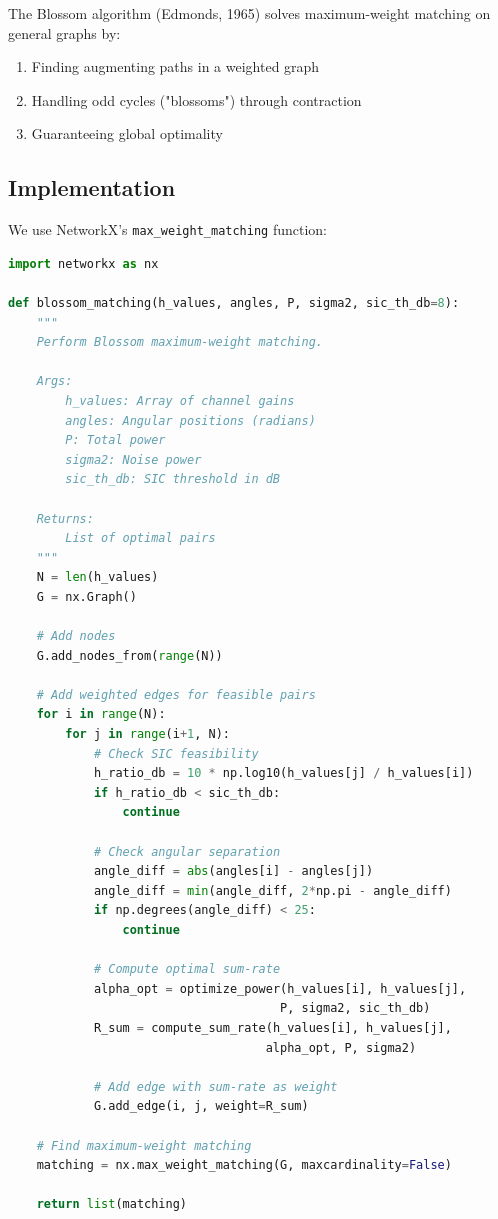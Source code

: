 The Blossom algorithm (Edmonds, 1965) solves maximum-weight matching on general graphs by:

\begin{enumerate}
    \item Finding augmenting paths in a weighted graph
    \item Handling odd cycles ("blossoms") through contraction
    \item Guaranteeing global optimality
\end{enumerate}

\subsection{Implementation}

We use NetworkX's \texttt{max\_weight\_matching} function:

\begin{lstlisting}[language=Python, caption={Blossom Matching Implementation}]
import networkx as nx

def blossom_matching(h_values, angles, P, sigma2, sic_th_db=8):
    """
    Perform Blossom maximum-weight matching.
    
    Args:
        h_values: Array of channel gains
        angles: Angular positions (radians)
        P: Total power
        sigma2: Noise power
        sic_th_db: SIC threshold in dB
    
    Returns:
        List of optimal pairs
    """
    N = len(h_values)
    G = nx.Graph()
    
    # Add nodes
    G.add_nodes_from(range(N))
    
    # Add weighted edges for feasible pairs
    for i in range(N):
        for j in range(i+1, N):
            # Check SIC feasibility
            h_ratio_db = 10 * np.log10(h_values[j] / h_values[i])
            if h_ratio_db < sic_th_db:
                continue
                
            # Check angular separation
            angle_diff = abs(angles[i] - angles[j])
            angle_diff = min(angle_diff, 2*np.pi - angle_diff)
            if np.degrees(angle_diff) < 25:
                continue
            
            # Compute optimal sum-rate
            alpha_opt = optimize_power(h_values[i], h_values[j],
                                      P, sigma2, sic_th_db)
            R_sum = compute_sum_rate(h_values[i], h_values[j],
                                    alpha_opt, P, sigma2)
            
            # Add edge with sum-rate as weight
            G.add_edge(i, j, weight=R_sum)
    
    # Find maximum-weight matching
    matching = nx.max_weight_matching(G, maxcardinality=False)
    
    return list(matching)
\end{lstlisting}

